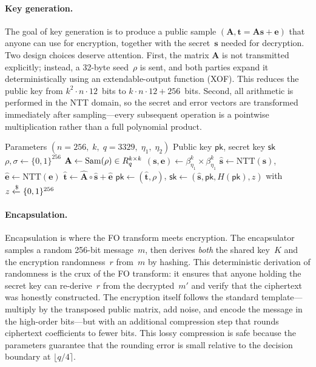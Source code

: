 \paragraph{Key generation.}
The goal of key generation is to produce a public \mlwe{} sample $(\mathbf{A}, \mathbf{t} = \mathbf{A}\mathbf{s} + \mathbf{e})$ that anyone can use for encryption, together with the secret~$\mathbf{s}$ needed for decryption.  Two design choices deserve attention.  First, the matrix $\mathbf{A}$ is not transmitted explicitly; instead, a 32-byte seed~$\rho$ is sent, and both parties expand it deterministically using an extendable-output function (XOF).  This reduces the public key from $k^2 \cdot n \cdot 12$~bits to $k \cdot n \cdot 12 + 256$~bits.  Second, all arithmetic is performed in the NTT domain, so the secret and error vectors are transformed immediately after sampling---every subsequent operation is a pointwise multiplication rather than a full polynomial product.

\begin{algorithm}[t]
\caption{ML-KEM.$\KeyGen$}
\label{alg:mlkem-keygen}
\begin{algorithmic}[1]
\Require Parameters $(n=256,\; k,\; q=3329,\; \eta_1,\; \eta_2)$
\Ensure Public key $\mathsf{pk}$, secret key $\mathsf{sk}$
\State $\rho, \sigma \leftarrow \{0,1\}^{256}$ 
\State $\mathbf{A} \gets \mathrm{Sam}(\rho) \in R_q^{k\times k}$ 
\State $(\mathbf{s}, \mathbf{e}) \leftarrow \beta_{\eta_1}^k \times \beta_{\eta_1}^k$ 
\State $\hat{\mathbf{s}} \gets \mathrm{NTT}(\mathbf{s})$, \quad $\hat{\mathbf{e}} \gets \mathrm{NTT}(\mathbf{e})$
\State $\hat{\mathbf{t}} \gets \hat{\mathbf{A}} \circ \hat{\mathbf{s}} + \hat{\mathbf{e}}$ 
\State $\mathsf{pk} \gets (\hat{\mathbf{t}}, \rho)$, \enspace $\mathsf{sk} \gets (\hat{\mathbf{s}}, \mathsf{pk}, H(\mathsf{pk}), z)$ with $z\getsr\{0,1\}^{256}$
\end{algorithmic}
\end{algorithm}

\paragraph{Encapsulation.}
Encapsulation is where the FO transform meets \mlwe{} encryption.  The encapsulator samples a random 256-bit message~$m$, then derives \emph{both} the shared key~$K$ and the encryption randomness~$r$ from~$m$ by hashing.  This deterministic derivation of randomness is the crux of the FO transform: it ensures that anyone holding the secret key can re-derive~$r$ from the decrypted~$m'$ and verify that the ciphertext was honestly constructed.  The encryption itself follows the standard \mlwe{} template---multiply by the transposed public matrix, add noise, and encode the message in the high-order bits---but with an additional compression step that rounds ciphertext coefficients to fewer bits.  This lossy compression is safe because the parameters guarantee that the rounding error is small relative to the decision boundary at $\lfloor q/4 \rceil$.

